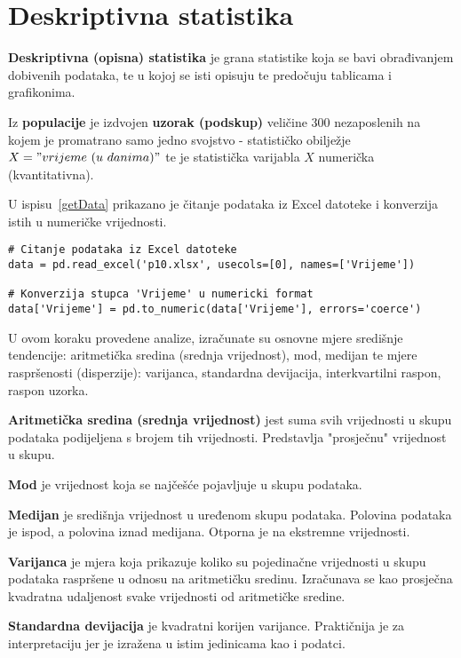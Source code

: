 \section{Deskriptivna statistika}

\textbf{Deskriptivna (opisna) statistika} je grana statistike koja se bavi obrađivanjem dobivenih podataka, te u kojoj se isti opisuju te predočuju tablicama i grafikonima.

Iz \textbf{populacije} je izdvojen \textbf{uzorak (podskup)} veličine 300 nezaposlenih na kojem je promatrano samo jedno svojstvo - statističko obilježje \(X = "vrijeme \ (u \ danima)"\) te je statistička varijabla \(X\) numerička (kvantitativna).

U ispisu~\ref{getData} prikazano je čitanje podataka iz Excel datoteke i konverzija istih u numeričke vrijednosti.

\begin{lstlisting}[caption={Pristup podatcima iz \texttt{p10.xlsx} Excel datoteke}, label=getData]
# Citanje podataka iz Excel datoteke
data = pd.read_excel('p10.xlsx', usecols=[0], names=['Vrijeme'])

# Konverzija stupca 'Vrijeme' u numericki format
data['Vrijeme'] = pd.to_numeric(data['Vrijeme'], errors='coerce')
\end{lstlisting}

U ovom koraku provedene analize, izračunate su osnovne mjere središnje tendencije: aritmetička sredina (srednja vrijednost), mod, medijan te mjere raspršenosti (disperzije): varijanca, standardna devijacija, interkvartilni raspon, raspon uzorka.

\textbf{Aritmetička sredina (srednja vrijednost)} jest suma svih vrijednosti u skupu podataka podijeljena s brojem tih vrijednosti. Predstavlja "prosječnu" vrijednost u skupu.

\textbf{Mod} je vrijednost koja se najčešće pojavljuje u skupu podataka.

\textbf{Medijan} je središnja vrijednost u uređenom skupu podataka. Polovina podataka je ispod, a polovina iznad medijana. Otporna je na ekstremne vrijednosti.

\textbf{Varijanca} je mjera koja prikazuje koliko su pojedinačne vrijednosti u skupu podataka raspršene u odnosu na aritmetičku sredinu. Izračunava se kao prosječna kvadratna udaljenost svake vrijednosti od aritmetičke sredine.

\textbf{Standardna devijacija} je kvadratni korijen varijance. Praktičnija je za interpretaciju jer je izražena u istim jedinicama kao i podatci.


